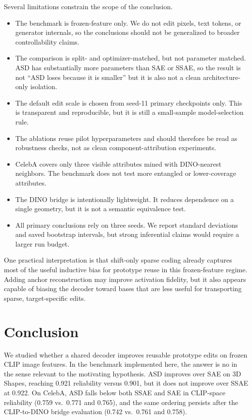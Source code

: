 \documentclass{article}
\begin{document}
Several limitations constrain the scope of the conclusion.
\begin{itemize}
  \item The benchmark is frozen-feature only. We do not edit pixels, text tokens, or generator internals, so the conclusions should not be generalized to broader controllability claims.
  \item The comparison is split- and optimizer-matched, but not parameter matched. ASD has substantially more parameters than SAE or SSAE, so the result is not ``ASD loses because it is smaller'' but it is also not a clean architecture-only isolation.
  \item The default edit scale is chosen from seed-11 primary checkpoints only. This is transparent and reproducible, but it is still a small-sample model-selection rule.
  \item The ablations reuse pilot hyperparameters and should therefore be read as robustness checks, not as clean component-attribution experiments.
  \item CelebA covers only three visible attributes mined with DINO-nearest neighbors. The benchmark does not test more entangled or lower-coverage attributes.
  \item The DINO bridge is intentionally lightweight. It reduces dependence on a single geometry, but it is not a semantic equivalence test.
  \item All primary conclusions rely on three seeds. We report standard deviations and saved bootstrap intervals, but strong inferential claims would require a larger run budget.
\end{itemize}

One practical interpretation is that shift-only sparse coding already captures most of the useful inductive bias for prototype reuse in this frozen-feature regime. Adding anchor reconstruction may improve activation fidelity, but it also appears capable of biasing the decoder toward bases that are less useful for transporting sparse, target-specific edits.

\section{Conclusion}
\label{sec:conclusion}

We studied whether a shared decoder improves reusable prototype edits on frozen CLIP image features. In the benchmark implemented here, the answer is no in the sense relevant to the motivating hypothesis. ASD improves over SAE on 3D Shapes, reaching 0.921 reliability versus 0.901, but it does not improve over SSAE at 0.922. On CelebA, ASD falls below both SSAE and SAE in CLIP-space reliability (0.759 vs.\ 0.771 and 0.765), and the same ordering persists after the CLIP-to-DINO bridge evaluation (0.742 vs.\ 0.761 and 0.758).
\end{document}
